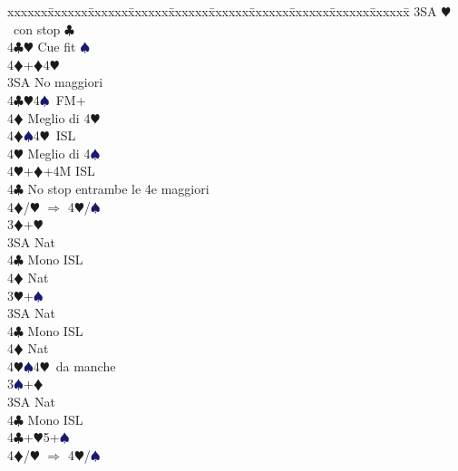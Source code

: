 \documentclass[a4paper,italian]{article}
\newcommand{\BC}{\textcolor{OliveGreen}{$\clubsuit$}}
\newcommand{\BD}{\textcolor{RedOrange}{$\vardiamondsuit$}}
\newcommand{\BH}{\textcolor{Red2}{$\varheartsuit${}}}
\newcommand{\BS}{\textcolor{MidnightBlue}{$\spadesuit${}}}
\newenvironment{bidtable}
{\begin{tabbing}

    xxxxxx\=xxxxxx\=xxxxxx\=xxxxxx\=xxxxxx\=xxxxxx\=xxxxxx\=xxxxxx\=xxxxxx\=xxxxxx\=\kill}
{\end{tabbing} }%
\begin{document}
\begin{multicols}{2}
\begin{bidtable}
                                            3SA \BH\ con stop \BC \\
                                            4\BC\BH \> Cue fit \BS \\
                                            4\BD {}+\BD 4\BH \-\\
                                            3SA \> No maggiori\+\\
                                            4\BC {}\BH 4\BS\ FM+\+\\
                                            4\BD \> Meglio di 4\BH \-\\
                                            4\BD {}\BS 4\BH\ ISL\+\\
                                            4\BH \> Meglio di 4\BS \-\\
                                            4\BH {}+\BD +4M ISL\-\\
                                            4\BC\> No stop entrambe le 4e maggiori\+\\
                                            4\BD/\BH\> $\Rightarrow$ 4\BH/\BS\-\\
                                            3\BD {}+\BH \+\\
                                            3SA \> Nat\+\\
                                            4\BC \> Mono ISL\\
                                            4\BD \> Nat\-\-\\
                                            3\BH {}+\BS \+\\
                                            3SA \> Nat\+\\
                                            4\BC \> Mono ISL\\
                                            4\BD \> Nat\\
                                            4\BH {}\BS 4\BH\ da manche\-\-\\
                                            3\BS {}+\BD \+\\
                                            3SA \> Nat\+\\
                                            4\BC \> Mono ISL\-\-\\
                                            4\BC {}+\BH5+\BS\\
                                            4\BD/\BH \> $\Rightarrow$ 4\BH /\BS \-
                                        \end{bidtable}


\end{multicols}
\end{document}
